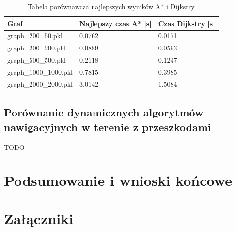 \documentclass[12pt,twoside]{article}
\begin{document}
\begin{table}[ht]
\caption{Tabela porównawcza najlepszych wyników A* i Dijkstry}
\centering		
\begin{tabular}{|p{}|p{}|p{}|}	
\hline
Graf & Najlepszy czas A* [s] & Czas Dijkstry [s] \\
\hline
graph\_200\_50.pkl & 
0.0762 & 
0.0171 \\
graph\_200\_200.pkl & 
0.0889 & 
0.0593 \\
graph\_500\_500.pkl & 
0.2118 & 
0.1247 \\
graph\_1000\_1000.pkl & 
0.7815 & 
0.3985 \\
graph\_2000\_2000.pkl & 
3.0142 & 
1.5084 \\
\hline
\end{tabular}	

\label{Tab:comparison}
\end{table}

\clearpage

\subsection{Porównanie dynamicznych algorytmów nawigacyjnych w terenie z przeszkodami}
TODO
\section{Podsumowanie i wnioski końcowe}

\section*{Załączniki}



\clearpage

\end{document}
